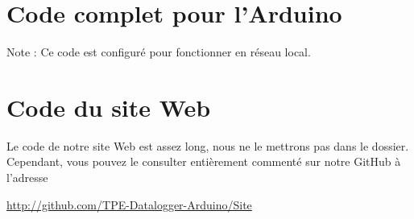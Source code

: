 \chapter{Code complet pour l'Arduino}

\label{code:arduino}
Note : Ce code est configuré pour fonctionner en réseau local.


\chapter{Code du site Web}

Le code de notre site Web est assez long, nous ne le mettrons pas dans le dossier. Cependant, vous pouvez le consulter entièrement commenté sur notre GitHub à l'adresse
\begin{center}
	\url{http://github.com/TPE-Datalogger-Arduino/Site}
\end{center}
